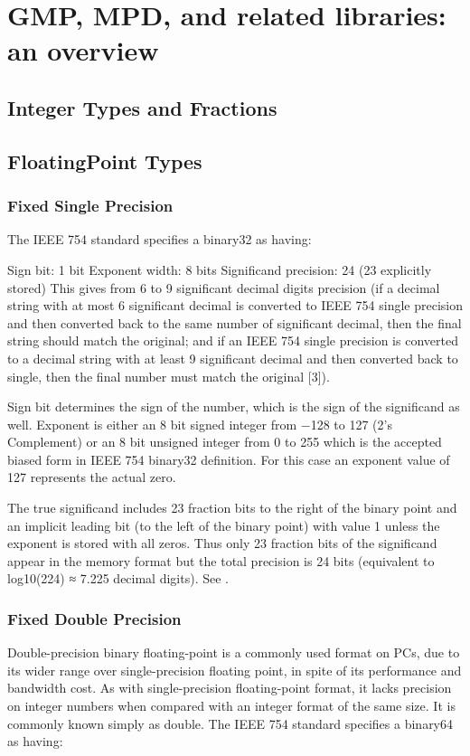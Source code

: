 
\chapter{GMP, MPD,  and related libraries: an overview}




\section{Integer Types and Fractions}

\section{FloatingPoint Types}
\label{FloatingPointTypes}

\subsection{Fixed Single Precision}
The IEEE 754 standard specifies a binary32 as having:

Sign bit: 1 bit
Exponent width: 8 bits
Significand precision: 24 (23 explicitly stored)
This gives from 6 to 9 significant decimal digits precision (if a decimal string with at most 6 significant decimal is converted to IEEE 754 single precision and then converted back to the same number of significant decimal, then the final string should match the original; and if an IEEE 754 single precision is converted to a decimal string with at least 9 significant decimal and then converted back to single, then the final number must match the original [3]).

Sign bit determines the sign of the number, which is the sign of the significand as well. Exponent is either an 8 bit signed integer from −128 to 127 (2's Complement) or an 8 bit unsigned integer from 0 to 255 which is the accepted biased form in IEEE 754 binary32 definition. For this case an exponent value of 127 represents the actual zero.

The true significand includes 23 fraction bits to the right of the binary point and an implicit leading bit (to the left of the binary point) with value 1 unless the exponent is stored with all zeros. Thus only 23 fraction bits of the significand appear in the memory format but the total precision is 24 bits (equivalent to log10(224) ≈ 7.225 decimal digits).  See \cite{Kahan_1997}.


\subsection{Fixed Double Precision}
Double-precision binary floating-point is a commonly used format on PCs, due to its wider range over single-precision floating point, in spite of its performance and bandwidth cost. As with single-precision floating-point format, it lacks precision on integer numbers when compared with an integer format of the same size. It is commonly known simply as double. The IEEE 754 standard specifies a binary64 as having:

